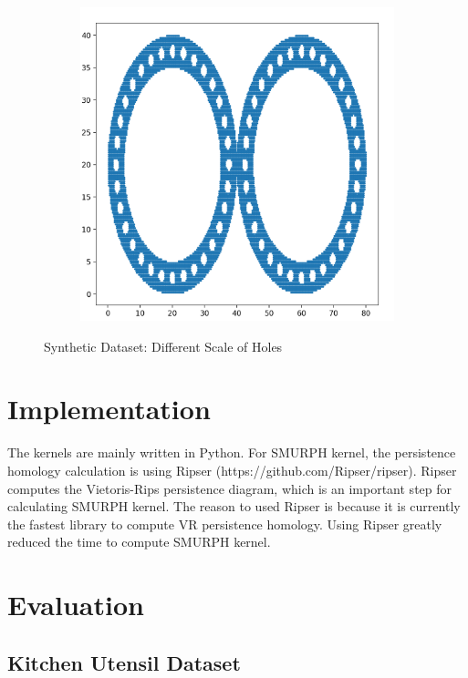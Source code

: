 \documentclass[10pt]{article}
\begin{document}
\begin{figure}[H]
\begin{subfigure}[h]{0.2\textwidth}
    \end{subfigure}%
    \begin{subfigure}[h]{0.2\textwidth}
        \includegraphics[width=\linewidth]{ms_4}
    \end{subfigure}%
    \caption{Synthetic Dataset: Different Scale of Holes}
    \label{fig:multiscale_dataset}
\end{figure}

\section{Implementation}
The kernels are mainly written in Python.
For SMURPH kernel, the persistence homology calculation is using Ripser (https://github.com/Ripser/ripser).
Ripser computes the Vietoris-Rips persistence diagram, which is an important step for calculating SMURPH kernel. 
The reason to used Ripser is because it is currently the fastest library to compute VR persistence homology.
Using Ripser greatly reduced the time to compute SMURPH kernel.

\section{Evaluation}

\subsection{Kitchen Utensil Dataset}
\end{document}
